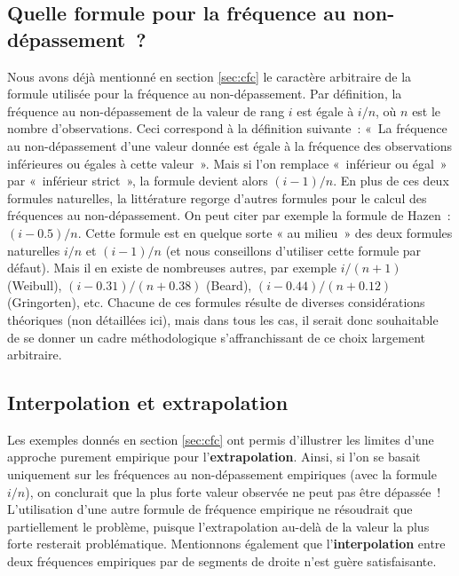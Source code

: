 \documentclass[
]{book}
\begin{document}
\subsection{Quelle formule pour la fréquence au non-dépassement~?}\label{quelle-formule-pour-la-fruxe9quence-au-non-duxe9passement}

Nous avons déjà mentionné en section \ref{sec:cfc} le caractère arbitraire de la formule utilisée pour la fréquence au non-dépassement. Par définition, la fréquence au non-dépassement de la valeur de rang \(i\) est égale à \(i/n\), où \(n\) est le nombre d'observations. Ceci correspond à la définition suivante~: «~La fréquence au non-dépassement d'une valeur donnée est égale à la fréquence des observations inférieures ou égales à cette valeur~». Mais si l'on remplace «~inférieur ou égal~» par «~inférieur strict~», la formule devient alors \((i-1)/n\). En plus de ces deux formules naturelles, la littérature regorge d'autres formules pour le calcul des fréquences au non-dépassement. On peut citer par exemple la formule de Hazen~: \((i-0.5)/n\). Cette formule est en quelque sorte « au milieu~» des deux formules naturelles \(i/n\) et \((i-1)/n\) (et nous conseillons d'utiliser cette formule par défaut). Mais il en existe de nombreuses autres, par exemple \(i/(n+1)\) (Weibull), \((i-0.31)/(n+0.38)\) (Beard), \((i-0.44)/(n+0.12)\) (Gringorten), etc. Chacune de ces formules résulte de diverses considérations théoriques (non détaillées ici), mais dans tous les cas, il serait donc souhaitable de se donner un cadre méthodologique s'affranchissant de ce choix largement arbitraire.

\subsection{Interpolation et extrapolation}\label{interpolation-et-extrapolation}

Les exemples donnés en section \ref{sec:cfc} ont permis d'illustrer les limites d'une approche purement empirique pour l'\textbf{extrapolation}. Ainsi, si l'on se basait uniquement sur les fréquences au non-dépassement empiriques (avec la formule \(i/n\)), on conclurait que la plus forte valeur observée ne peut pas être dépassée~! L'utilisation d'une autre formule de fréquence empirique ne résoudrait que partiellement le problème, puisque l'extrapolation au-delà de la valeur la plus forte resterait problématique. Mentionnons également que l'\textbf{interpolation} entre deux fréquences empiriques par de segments de droite n'est guère satisfaisante.
\end{document}
